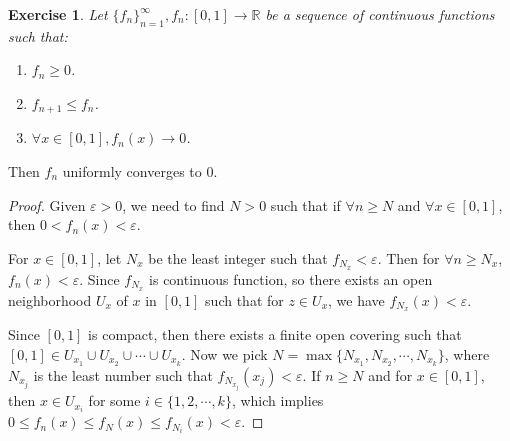 \documentclass[12pt,leqno]{amsart}
\newtheorem{exercise}{Exercise}[section]
\theoremstyle{definition}
\numberwithin{equation}{subsection}
\begin{document}
\begin{exercise}
Let $\{f_n\}^\infty_{n=1}, f_n:[0,1]\to\mathbb{R}$ be a sequence of continuous functions such that:
\begin{enumerate}
    \item $f_n \geq 0$.
    \item $f_{n+1}\leq f_n$.
    \item $\forall x\in [0,1], f_n(x)\to 0$.
\end{enumerate}
\end{exercise}
Then $f_n$ uniformly converges to $0$.
\begin{proof}
Given $\varepsilon > 0$, we need to find $N > 0$ such that if $\forall n \geq N$ and $\forall x\in [0,1]$, then $0 < f_n(x) < \varepsilon$.

For $x\in [0,1]$, let $N_x$ be the least integer such that $f_{N_x} < \varepsilon$. Then for $\forall n \geq N_x$, $f_n(x) < \varepsilon$. Since $f_{N_x}$ is continuous function, so there exists an open neighborhood $U_x$ of $x$ in $[0,1]$ such that for $z\in U_x$, we have $f_{N_x}(x) < \varepsilon$. 

Since $[0,1]$ is compact, then there exists a finite open covering such that $[0,1]\in U_{x_1}\cup U_{x_2} \cup \cdots \cup U_{x_k}$. Now we pick $N = \max\{N_{x_1},N_{x_2},\cdots,N_{x_k}\}$, where $N_{x_j}$ is the least number such that $f_{N_{x_j}}(x_j) < \varepsilon$. If $n\geq N$ and for $x\in[0,1]$, then $x\in U_{x_i}$ for some $i\in\{1,2,\cdots, k\}$, which implies $0 \leq f_n(x) \leq f_N(x) \leq f_{N_i}(x) < \varepsilon$.
\end{proof}
\end{document}
